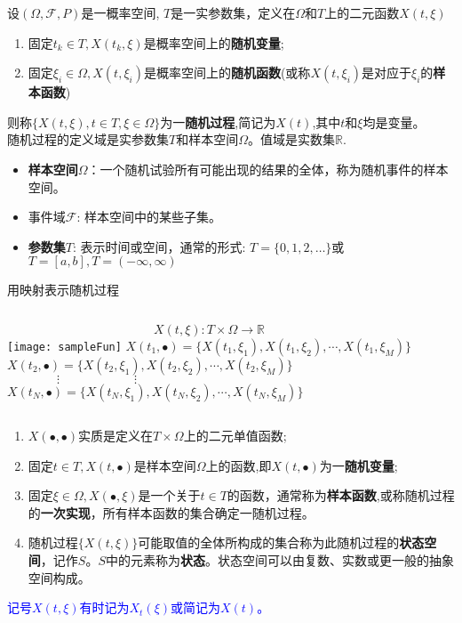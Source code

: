 \begin{frame}%
\begin{definition}[随机过程]
	设$(\Omega,\mathcal{F},P)$是一概率空间, $T$是一实参数集，定义在$\Omega$和$T$上的二元函数$X(t,\xi)$
	\begin{enumerate}
		\item 固定$t_k\in T,X(t_k,\xi)$是概率空间上的\textbf{随机变量};
		\item 固定$\xi_i\in\Omega,X(t,\xi_i)$是概率空间上的\textbf{随机函数}(或称$X(t,\xi_i)$是对应于$\xi_i$的\textbf{样本函数})
	\end{enumerate}
    则称$\{X(t,\xi),t\in T,\xi\in \Omega \}$为一\textbf{随机过程},简记为$X(t)$,其中$t$和$\xi$均是变量。\\
	随机过程的定义域是实参数集$T$和样本空间$\Omega$。值域是实数集$\mathbb{R}$.
	\begin{itemize}
		\item \textbf{样本空间$\Omega$}：一个随机试验所有可能出现的结果的全体，称为随机事件的样本空间。\\
		\item 事件域$\mathcal{F}$: 样本空间中的某些子集。
		\item
		\textbf{参数集$T$}: 表示时间或空间，通常的形式: $T=\{0,1,2,\dots \}$或$T=[a,b],T=(-\infty,\infty)$
	\end{itemize}
	\end{definition}
\end{frame}

\begin{frame}{用映射表示随机过程} 
\begin{columns}
	\small
	\[X(t,\xi): T\times\Omega\to\mathbb{R} \]
	\texttt{[image: sampleFun]}
	\small
	$X(t_1,\bullet)=\{X(t_1,\xi_1), X(t_1,\xi_2),\cdots, X(t_1,\xi_M)\}$	\\
	$X(t_2,\bullet)=\{X(t_2,\xi_1), X(t_2,\xi_2),\cdots, X(t_2,\xi_M)\}$	\\
	$\qquad\qquad\vdots\qquad\qquad\qquad\vdots$\\
	$X(t_N,\bullet)=\{X(t_N,\xi_1), X(t_N,\xi_2),\cdots, X(t_N,\xi_M)\}$
\end{columns}
\begin{enumerate}
	\item $X(\bullet,\bullet)$实质是定义在$T\times\Omega$上的二元单值函数;
	\item 固定$t\in T,X(t,\bullet)$是样本空间$\Omega$上的函数,即$X(t,\bullet)$为一\textbf{随机变量};
	\item 固定$\xi\in\Omega,X(\bullet,\xi)$是一个关于$t\in T$的函数，通常称为\textbf{样本函数},或称随机过程的\textbf{一次实现}，所有样本函数的集合确定一随机过程。
	\item 随机过程$\{X(t,\xi)\}$可能取值的全体所构成的集合称为此随机过程的\textbf{状态空间}，记作$S$。$S$中的元素称为\textbf{状态}。状态空间可以由复数、实数或更一般的抽象空间构成。
\end{enumerate}
\textcolor{blue}{记号$X(t,\xi)$有时记为$X_t(\xi)$或简记为$X(t)$。}
\end{frame}


